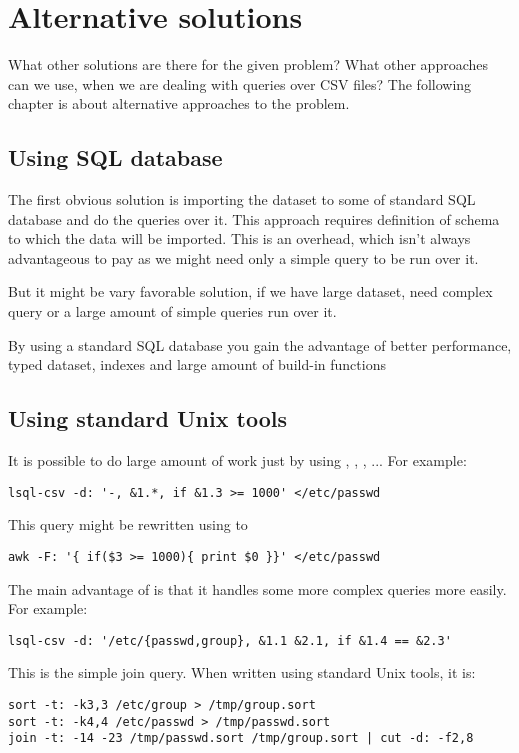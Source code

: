 
\chapter{Alternative solutions}
What other solutions are there for the given problem? What other approaches can we use, when we are dealing with queries over CSV files? 
The following chapter is about alternative approaches to the problem.

\section{Using SQL database}
The first obvious solution is importing the dataset to some of standard SQL database and do the queries over it. 
This approach requires definition of schema to which the data will be imported. This is an overhead, which isn't
always advantageous to pay as we might need only a simple query to be run over it.

But it might be vary favorable solution, if we have large dataset, need complex query or a large amount of simple queries run over it.

By using a standard SQL database you gain the advantage of better performance, typed dataset, indexes and large amount of build-in functions

\section{Using standard Unix tools}
It is possible to do large amount of work just by using , , , ...
For example:

\begin{verbatim}
lsql-csv -d: '-, &1.*, if &1.3 >= 1000' </etc/passwd
\end{verbatim}

This query might be rewritten using  to
\begin{verbatim}
awk -F: '{ if($3 >= 1000){ print $0 }}' </etc/passwd
\end{verbatim}

The main advantage of  is that it handles some more complex queries more easily. For example:
\begin{verbatim}
lsql-csv -d: '/etc/{passwd,group}, &1.1 &2.1, if &1.4 == &2.3'
\end{verbatim}

This is the simple join query. When written using standard Unix tools, it is:
\begin{verbatim}
sort -t: -k3,3 /etc/group > /tmp/group.sort
sort -t: -k4,4 /etc/passwd > /tmp/passwd.sort
join -t: -14 -23 /tmp/passwd.sort /tmp/group.sort | cut -d: -f2,8 
\end{verbatim}

